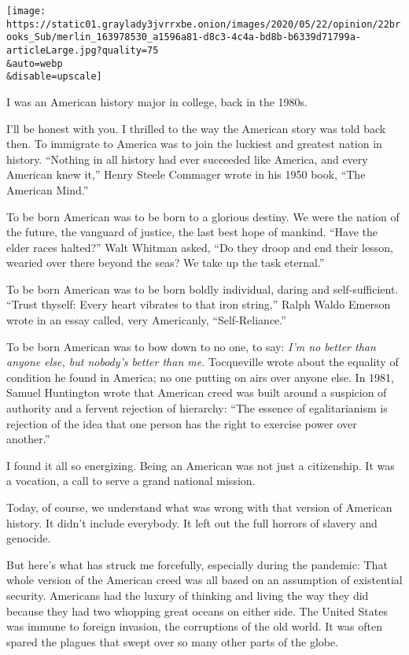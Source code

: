 \texttt{[image: https://static01.graylady3jvrrxbe.onion/images/2020/05/22/opinion/22brooks\_Sub/merlin\_163978530\_a1596a81-d8c3-4c4a-bd8b-b6339d71799a-articleLarge.jpg?quality=75\\\&auto=webp\\\&disable=upscale]}

I was an American history major in college, back in the 1980s.

I'll be honest with you. I thrilled to the way the American story was
told back then. To immigrate to America was to join the luckiest and
greatest nation in history. ``Nothing in all history had ever succeeded
like America, and every American knew it,'' Henry Steele Commager wrote
in his 1950 book, ``The American Mind.''

To be born American was to be born to a glorious destiny. We were the
nation of the future, the vanguard of justice, the last best hope of
mankind. ``Have the elder races halted?'' Walt Whitman asked, ``Do they
droop and end their lesson, wearied over there beyond the seas? We take
up the task eternal.''

To be born American was to be born boldly individual, daring and
self-sufficient. ``Trust thyself: Every heart vibrates to that iron
string,'' Ralph Waldo Emerson wrote in an essay called, very Americanly,
``Self-Reliance.''

To be born American was to bow down to no one, to say: \emph{I'm no
better than anyone else, but nobody's better than me.} Tocqueville wrote
about the equality of condition he found in America; no one putting on
airs over anyone else. In 1981, Samuel Huntington wrote that American
creed was built around a suspicion of authority and a fervent rejection
of hierarchy: ``The essence of egalitarianism is rejection of the idea
that one person has the right to exercise power over another.''

I found it all so energizing. Being an American was not just a
citizenship. It was a vocation, a call to serve a grand national
mission.

Today, of course, we understand what was wrong with that version of
American history. It didn't include everybody. It left out the full
horrors of slavery and genocide.

But here's what has struck me forcefully, especially during the
pandemic: That whole version of the American creed was all based on an
assumption of existential security. Americans had the luxury of thinking
and living the way they did because they had two whopping great oceans
on either side. The United States was immune to foreign invasion, the
corruptions of the old world. It was often spared the plagues that swept
over so many other parts of the globe.

